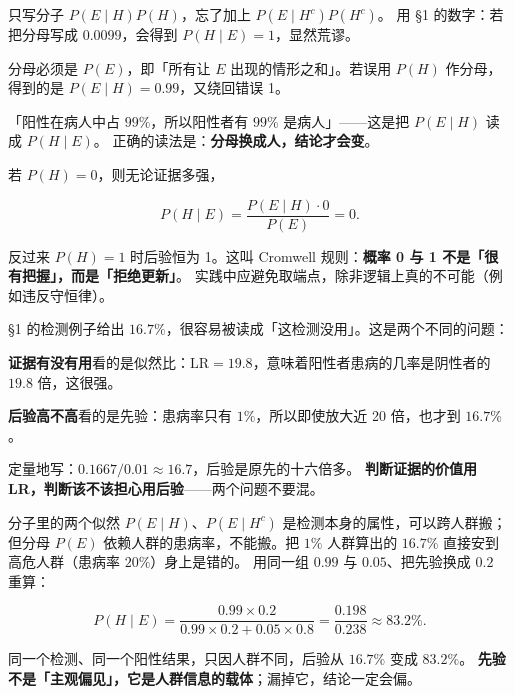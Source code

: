 \documentclass[11pt]{ctexart}
\begin{document}

只写分子 $P(E\mid H)P(H)$，忘了加上 $P(E\mid H^{c})P(H^{c})$。
用 §1 的数字：若把分母写成 $0.0099$，会得到 $P(H\mid E)=1$，显然荒谬。


分母必须是 $P(E)$，即「所有让 $E$ 出现的情形之和」。若误用 $P(H)$ 作分母，
得到的是 $P(E\mid H)=0.99$，又绕回错误 1。


「阳性在病人中占 $99\%$，所以阳性者有 $99\%$ 是病人」——这是把 $P(E\mid H)$ 读成 $P(H\mid E)$。
正确的读法是：\textbf{分母换成人，结论才会变}。


若 $P(H)=0$，则无论证据多强，

\[
P(H\mid E)=\frac{P(E\mid H)\cdot 0}{P(E)}=0 .
\]

反过来 $P(H)=1$ 时后验恒为 1。这叫 Cromwell 规则：\textbf{概率 0 与 1 不是「很有把握」，而是「拒绝更新」}。
实践中应避免取端点，除非逻辑上真的不可能（例如违反守恒律）。


§1 的检测例子给出 $16.7\%$，很容易被读成「这检测没用」。这是两个不同的问题：

\textbf{证据有没有用}看的是似然比：$\mathrm{LR}=19.8$，意味着阳性者患病的几率是阴性者的 $19.8$ 倍，这很强。

\textbf{后验高不高}看的是先验：患病率只有 $1\%$，所以即使放大近 20 倍，也才到 $16.7\%$。

定量地写：$0.1667/0.01\approx 16.7$，后验是原先的十六倍多。
\textbf{判断证据的价值用 LR，判断该不该担心用后验}——两个问题不要混。


分子里的两个似然 $P(E\mid H)$、$P(E\mid H^{c})$ 是检测本身的属性，可以跨人群搬；
但分母 $P(E)$ 依赖人群的患病率，不能搬。把 $1\%$ 人群算出的 $16.7\%$ 直接安到高危人群（患病率 $20\%$）身上是错的。
用同一组 $0.99$ 与 $0.05$、把先验换成 $0.2$ 重算：

\[
P(H\mid E)=\frac{0.99\times0.2}{0.99\times0.2+0.05\times0.8}=\frac{0.198}{0.238}\approx 83.2\% .
\]

同一个检测、同一个阳性结果，只因人群不同，后验从 $16.7\%$ 变成 $83.2\%$。
\textbf{先验不是「主观偏见」，它是人群信息的载体}；漏掉它，结论一定会偏。

\end{document}
